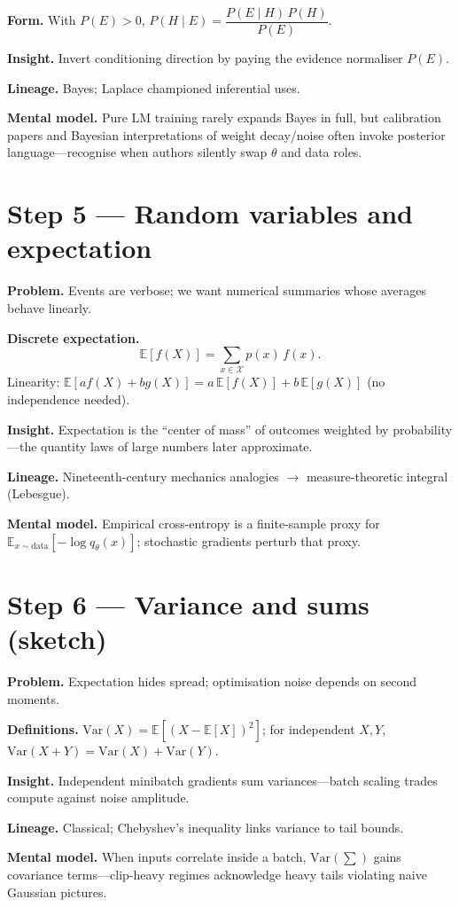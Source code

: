 \textbf{Form.} With $P(E)>0$, $P(H\mid E)=\dfrac{P(E\mid H)\,P(H)}{P(E)}$.

\textbf{Insight.} Invert conditioning direction by paying the evidence normaliser $P(E)$.

\textbf{Lineage.} Bayes; Laplace championed inferential uses.

\textbf{Mental model.} Pure LM training rarely expands Bayes in full, but calibration papers and Bayesian interpretations of weight decay/noise often invoke posterior language---recognise when authors silently swap $\theta$ and data roles.

\section*{Step 5 --- Random variables and expectation}
\textbf{Problem.} Events are verbose; we want numerical summaries whose averages behave linearly.

\textbf{Discrete expectation.}
\[
  \mathbb{E}[f(X)]=\sum_{x\in\mathcal{X}} p(x)\,f(x).
\]
Linearity: $\mathbb{E}[a f(X)+b g(X)] = a\,\mathbb{E}[f(X)] + b\,\mathbb{E}[g(X)]$ (no independence needed).

\textbf{Insight.} Expectation is the ``center of mass'' of outcomes weighted by probability---the quantity laws of large numbers later approximate.

\textbf{Lineage.} Nineteenth-century mechanics analogies $\to$ measure-theoretic integral (Lebesgue).

\textbf{Mental model.} Empirical cross-entropy is a finite-sample proxy for $\mathbb{E}_{x\sim\text{data}}[-\log q_\theta(x)]$; stochastic gradients perturb that proxy.

\section*{Step 6 --- Variance and sums (sketch)}
\textbf{Problem.} Expectation hides spread; optimisation noise depends on second moments.

\textbf{Definitions.} $\mathrm{Var}(X)=\mathbb{E}[(X-\mathbb{E}[X])^2]$; for independent $X,Y$, $\mathrm{Var}(X+Y)=\mathrm{Var}(X)+\mathrm{Var}(Y)$.

\textbf{Insight.} Independent minibatch gradients sum variances---batch scaling trades compute against noise amplitude.

\textbf{Lineage.} Classical; Chebyshev's inequality links variance to tail bounds.

\textbf{Mental model.} When inputs correlate inside a batch, $\mathrm{Var}(\sum)$ gains covariance terms---clip-heavy regimes acknowledge heavy tails violating naive Gaussian pictures.

